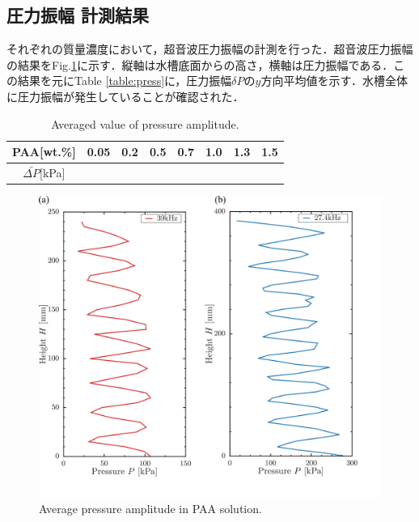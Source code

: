 \newpage

\subsection{圧力振幅 計測結果}

それぞれの質量濃度において，超音波圧力振幅の計測を行った．超音波圧力振幅の結果をFig.\ref{fig:pressure}に示す．縦軸は水槽底面からの高さ，横軸は圧力振幅である．この結果を元にTable \ref{table:press}に，圧力振幅$\delta{}P$の$y$方向平均値を示す．水槽全体に圧力振幅が発生していることが確認された．

\begin{table}[h]
	\centering
	\caption{Averaged value of pressure amplitude.}
	\label{table:press-A}
	\begin{tabular}{c|c|c|c|c|c|c|c} \hline
		PAA[wt.\%]             & 0.05 & 0.2 & 0.5 & 0.7 & 1.0 & 1.3 & 1.5 \\ \hline \hline
		$\bar{\Delta{}P}$[kPa] &      &     &     &     &     &     &     \\ \hline
	\end{tabular}
\end{table}

\begin{figure}[ht]
	\centering
	\includegraphics[width=12cm,clip]{4-Results/press.png}
	\caption{Average pressure amplitude in PAA solution.}
	\label{fig:pressure}
\end{figure}
